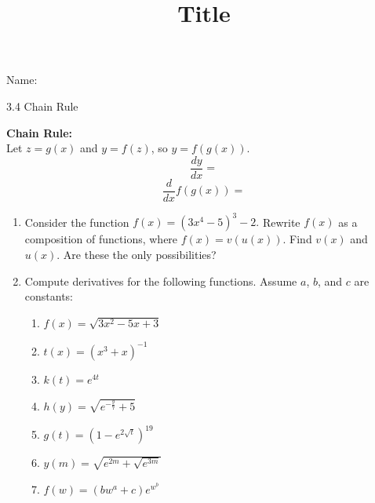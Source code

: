\documentclass[12pt]{article}
\title{Title}
\begin{document}

 Name:
 \begin{center}\large{3.4 Chain Rule}\end{center}

\begin{tcolorbox}

\textbf{Chain Rule:} \\
Let $z=g(x)$ and $y=f(z)$, so $y=f(g(x))$.\\

$$\frac{dy}{dx}=$$%
\vspace{5mm}
$$\frac{d}{dx}f(g(x))=$$

\end{tcolorbox}

\begin{enumerate}
\item Consider the function $f\left(x\right)=\left(3x^{4}-5\right)^{3}-2.$ Rewrite $f\left(x\right)$ as a composition of functions, where $f\left(x\right)=v\left(u\left(x\right)\right).$ Find $v\left(x\right)$ and $u\left(x\right)$. Are these the only possibilities?
\vfill

\item Compute derivatives for the following functions. Assume $a$, $b$, and $c$ are constants:
\begin{multicols}{2}
\begin{enumerate}[itemsep=3cm]
\item $\displaystyle f(x)=\sqrt{3x^{2}-5x+3}$
\item $\displaystyle t(x)=(x^{3}+x)^{-1}$
\item $\displaystyle k(t)=e^{4t}$
\item $\displaystyle h(y)=\sqrt{e^{-\frac{y}{7}}+5}$
\item $\displaystyle g(t)=\left(1-e^{2\sqrt{t}}\right)^{19}$
\item $\displaystyle y(m)=\sqrt{e^{2m}+\sqrt{e^{3m}}}$
\item $\displaystyle f(w) = (bw^{a}+c)e^{w^{b}}$

\end{enumerate}
\end{multicols}



\newpage


\end{enumerate}
\end{document}
